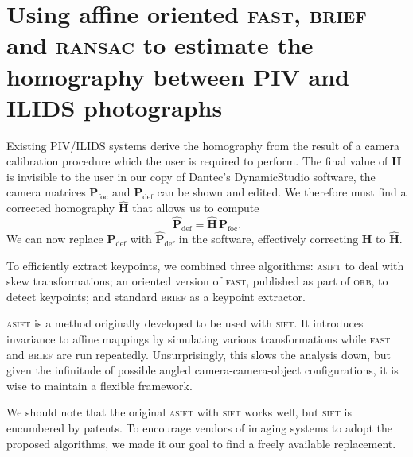 \documentclass[floatfix,aip,rsi,reprint,graphicx]{revtex4-1}
\begin{document}
\section{Using affine oriented \textsc{fast}, \textsc{brief} and \textsc{ransac} to estimate the homography
between PIV and ILIDS photographs \label{sec:results}}

Existing PIV/ILIDS systems derive the homography from the result of a camera
calibration procedure which the user is required to perform.
The final value of $\mathbf{H}$ is invisible to the user in our copy of
Dantec's DynamicStudio software, the camera matrices $\mathbf{P}_\text{foc}$ and
$\mathbf{P}_\text{def}$ can be shown and edited. We therefore must find a
corrected homography $\mathbf{\hat{H}}$ that allows us to compute
\begin{equation}
    \mathbf{\hat{P}}_\text{def} = \mathbf{\hat{H}} \, \mathbf{P}_\text{foc}.
    \label{corrected-homography-use}
\end{equation}
We can now replace $\mathbf{P}_\text{def}$ with $\mathbf{\hat{P}}_\text{def}$ in
the software, effectively correcting $\mathbf{H}$ to $\mathbf{\hat{H}}$.

To efficiently extract keypoints, we combined three algorithms:
\textsc{asift}\cite{} to deal with skew transformations; an oriented version of
\textsc{fast}, published as part of \textsc{orb}, to detect keypoints; and
standard \textsc{brief} as a keypoint extractor.

\textsc{asift} is a method originally developed to be used with \textsc{sift}.
It introduces invariance to affine mappings by simulating various
transformations while \textsc{fast} and \textsc{brief} are run repeatedly.
Unsurprisingly, this slows the analysis down, but given the infinitude of
possible angled camera-camera-object configurations, it is wise to maintain a
flexible framework.

We should note that the original \textsc{asift} with
\textsc{sift} works well, but \textsc{sift} is encumbered by patents. To
encourage vendors of imaging systems to adopt the proposed algorithms, we made
it our goal to find a freely available replacement.
\end{document}
